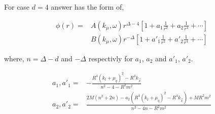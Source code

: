 For case $d =4$ answer has the form of, 

\begin{align}
    \phi(r) =& A(k_\mu,\omega)r^{\Delta-4}\left[1 + a_1\frac{1}{r^2} + a_2\frac{1}{r^4} + \cdots\right]\nonumber\\
             & B(k_\mu,\omega)r^{-\Delta} \left[1 + a'_1\frac{1}{r^2}+ a'_2\frac{1}{r^4}+ \cdots\right]
\end{align}

where, $n =\Delta-d$ and $-\Delta$ respectivly for $a_1$, $a_2$ and $a'_1$, $a'_2$.

\begin{align}
    a_1 , a'_1 =& -\frac{R^4(k_t+\mu_q)^2 - R^4k_{\vec{x}}}{n^2-4- R^2m^2}\nonumber\\
    a_2 , a'_2 =&  \frac{2M(n^2+2n)-a_2\left(R^4(k_t+\mu_q)^2 - R^4k_{\vec{x}}\right) + MR^2m^2}{n^2-4n - R^2m^2}
\end{align}

